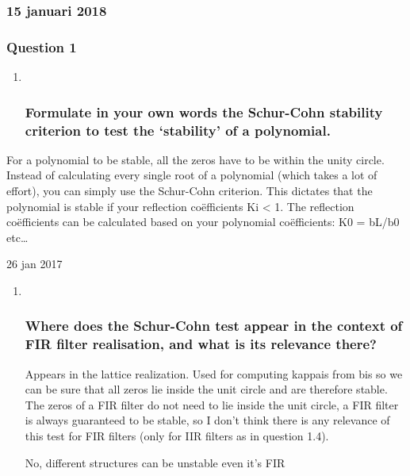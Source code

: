 \documentclass[
  a4paper,
  ,captions=tableheading
]{scrartcl}
\begin{document}
\subsubsection{\texorpdfstring{\textbf{15 januari
2018}}{15 januari 2018}}\label{januari-2018-1}

\subsubsection{Question 1}\label{question-1-6}

\begin{enumerate}
\def\labelenumi{\arabic{enumi}.}
\item ~
  \subsubsection{Formulate in your own words the Schur-Cohn stability
  criterion to test the `stability' of a
  polynomial.}\label{formulate-in-your-own-words-the-schur-cohn-stability-criterion-to-test-the-stability-of-a-polynomial.}
\end{enumerate}

For a polynomial to be stable, all the zeros have to be within the unity
circle. Instead of calculating every single root of a polynomial (which
takes a lot of effort), you can simply use the Schur-Cohn criterion.
This dictates that the polynomial is stable if your reflection
coëfficients \textbar Ki\textbar{} \textless{} 1. The reflection
coëfficients can be calculated based on your polynomial coëfficients: K0
= bL/b0 etc\ldots{}

26 jan 2017

\begin{enumerate}
\def\labelenumi{\arabic{enumi}.}
\setcounter{enumi}{1}
\item ~
  \subsubsection{Where does the Schur-Cohn test appear in the context of
  FIR filter realisation, and what is its relevance
  there?}\label{where-does-the-schur-cohn-test-appear-in-the-context-of-fir-filter-realisation-and-what-is-its-relevance-there}

  Appears in the lattice realization. Used for computing kappais from
  bis so we can be sure that all zeros lie inside the unit circle and
  are therefore stable.\\
  The zeros of a FIR filter do not need to lie inside the unit circle, a
  FIR filter is always guaranteed to be stable, so I don't think there
  is any relevance of this test for FIR filters (only for IIR filters as
  in question 1.4).

  No, different structures can be unstable even it's FIR
\end{enumerate}
\end{document}
